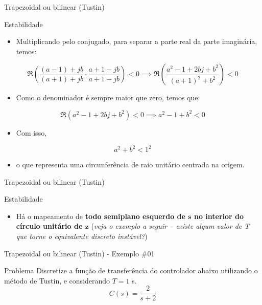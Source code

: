 \begin{frame}{Trapezoidal ou bilinear (Tustin)}
\begin{block}{Estabilidade}
\begin{itemize}
\item[] Multiplicando pelo conjugado, para separar a parte real da parte imaginária, temos:
\end{itemize}
$$\Re \left(\dfrac{(a-1)+jb}{(a+1)+jb} \cdot \dfrac{a+1 -jb}{a+1 -jb}\right) < 0 \implies \Re \left(\dfrac{a^2-1+2bj+b^2}{(a+1)^2+b^2}\right) < 0$$
\begin{itemize}
\item[] Como o denominador é sempre maior que zero, temos que:
\end{itemize}
$$\Re (a^2-1+2bj+b^2) < 0 \implies a^2-1+b^2 < 0$$
\begin{itemize}
\item[] Com isso,
\end{itemize}
$$a^2+b^2 < 1^2$$
\begin{itemize}
\vspace{-0.3cm}
\item[] o que representa uma circunferência de raio unitário centrada na origem.
\end{itemize}
\end{block}
\end{frame}


\begin{frame}{Trapezoidal ou bilinear (Tustin)}
\begin{block}{Estabilidade}
\begin{itemize}
    \item Há o mapeamento de \textbf{todo semiplano esquerdo de $ \bm{s} $ no interior do círculo unitário de $ \bm{z} $} (\textit{veja o exemplo a seguir -- existe algum valor de T que torne o equivalente discreto instável?})
\end{itemize}
\end{block}

\centering

\scalebox{0.9}{}
\end{frame}

\begin{frame}{Trapezoidal ou bilinear (Tustin) - Exemplo \#01}
\begin{block}{Problema}
Discretize a função de transferência do controlador abaixo utilizando o método de Tustin, e considerando $T= \num{1}$ s.
	\[ C(s)=\dfrac{2}{s+2} \]
\end{block}
\end{frame}


